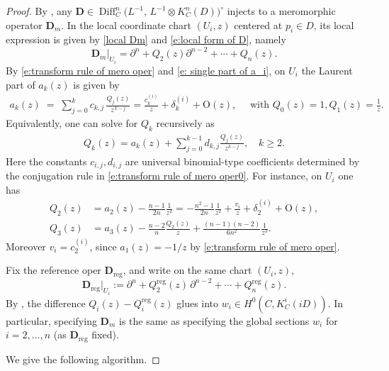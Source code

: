 \documentclass[twoside, 11pt]{article}
\numberwithin{equation}{section}
\theoremstyle{theorem}
\numberwithin{theorem}{section}
\theoremstyle{definition}
\begin{document}
\begin{proof}
By , any $\mathbf D\in \operatorname{Diff}_C^{n} \bigl(L^{-1},\,L^{-1}\otimes K_C^{n}(D)\bigr)^{\circ}$ injects to a meromorphic operator $\mathbf{D}_m$. 
In the local coordinate chart $(U_i,z)$ centered at $p_i\in D$, its local expression is given by \eqref{local Dm} and \eqref{e:local form of D}, namely
$$
\mathbf D_m|_{U_i}
        = \partial^n + Q_2(z)\partial^{n-2} + \cdots + Q_n(z).
$$
By \eqref{e:transform rule of mero oper} and \eqref{e: single part of a_i}, on $U_i$ the Laurent part of $a_k(z)$ is given by
\begin{align}\label{e: equ for a and Q}
a_k(z) \;=\; \sum_{j=0}^{k} c_{k,j}\,\frac{Q_j(z)}{z^{\,k-j}}= \frac{c_k^{(i)}}{z}+\delta_k^{(i)}+\mathrm O(z),
\quad \text{ with }Q_0(z)=1, Q_1(z)=\frac{1}{z}.
\end{align}
Equivalently, one can solve for $Q_k$ recursively as
\begin{align}\label{e: equ for a and Q;2}
    Q_k(z)=a_k(z)+ \sum_{j=0}^{k-1} d_{k,j} \frac{Q_j(z)}{z^{k-j}} ,
\quad k \ge 2.
\end{align}
Here the constants \(c_{i,j},d_{i,j}\) are universal binomial-type coefficients determined by the conjugation rule in \eqref{e:transform rule of mero oper0}.
For instance, on $U_i$ one has
\begin{align}
Q_2(z)
&=a_2(z)-\frac{n-1}{2n}\frac{1}{z^2}=-\frac{n^2-1}{2n}\frac{1}{z^2} + \frac{v_i}{z}+\delta_2^{(i)}+ \mathrm O(z), \label{e: eg expansion of Q2} \\
Q_3(z)
&=a_3(z)-\frac{n-2}{n}\frac{Q_2(z)}{z}
+\frac{(n-1)(n-2)}{6n^2}\frac{1}{z^3}. \label{e: eg expansion of Q3}
\end{align}
Moreover $v_i=c^{(i)}_2$, since $a_1(z)=-1/z$ by \eqref{e:transform rule of mero oper}.

Fix the reference oper $\mathbf D_{\mathrm{reg}}$, and write on the same chart $(U_i,z)$,
\[
  \mathbf{D}_{\mathrm{reg}}|_{U_i}
  := \partial^n + Q^{\mathrm{reg}}_2(z)\,\partial^{n-2} + \cdots + Q^{\mathrm{reg}}_n(z).
\]
By , the difference $Q_i(z) - Q^{\mathrm{reg}}_i(z)$ glues into $w_i \in H^0 \left(C, K_C^i(iD)\right)$. In particular, specifying $\mathbf D_m$ is the same as specifying the global sections
$w_i$ for $i=2,\dots,n$ (as $\mathbf D_{\mathrm{reg}}$ fixed).

We give the following algorithm.


\end{proof}
\end{document}
